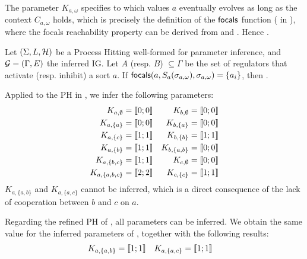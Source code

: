 The parameter $K_{a,\omega}$ specifies to which values $a$ eventually evolves as long as the context
$C_{a,\omega}$ holds, which is precisely the definition of the $\mathsf{focals}$ function
( in ),
where the focals reachability property can be derived from  and
.
Hence .

\begin{proposition}
\label{pps:param_K}
Let $(\Sigma, L, \mathcal{H})$ be a Process Hitting well-formed for parameter inference, and $\mathcal{G} = (\Gamma, E)$ the inferred IG.
Let $A$ (resp. $B$) $\subseteq \Gamma$ be the set of regulators that activate (resp. inhibit) a sort
$a$.
If $\mathsf{focals}(a,S_a(\sigma_{a,\omega}),\sigma_{a,\omega})= \{ a_i \}$, then .
\end{proposition}

\begin{example}
\label{ex:infer-param-runningPH-1}

Applied to the PH in , we infer the following parameters:
\begin{align*}
K_{a, \emptyset} &= \llbracket 0 ; 0 \rrbracket &
K_{b, \emptyset} &= \llbracket 0 ; 0 \rrbracket \\
K_{a, \{a\}} &= \llbracket 0 ; 0 \rrbracket &
K_{b, \{a\}} &= \llbracket 0 ; 0 \rrbracket \\
K_{a, \{c\}} &= \llbracket 1 ; 1 \rrbracket &
K_{b, \{b\}} &= \llbracket 1 ; 1 \rrbracket \\
K_{a, \{b\}} &= \llbracket 1 ; 1 \rrbracket &
K_{b, \{a,b\}} &= \llbracket 0 ; 0 \rrbracket \\
K_{a, \{b,c\}} &= \llbracket 1 ; 1 \rrbracket &
K_{c, \emptyset} &= \llbracket 0 ; 0 \rrbracket \\
K_{a, \{a,b,c\}} &= \llbracket 2 ; 2 \rrbracket &
K_{c, \{c\}} &= \llbracket 1 ; 1 \rrbracket
\end{align*}
$K_{a,\{a,b\}}$ and $K_{a,\{a,c\}}$ cannot be inferred,
which is a direct consequence of the lack of cooperation between $b$ and $c$ on $a$.
\end{example}

\begin{example}
Regarding the refined PH of , all parameters can be inferred.
We obtain the same value for the inferred parameters of ,
together with the following results:
\begin{align*}
  K_{a,\{a,b\}} &= \llbracket 1 ; 1 \rrbracket &
  K_{a,\{a,c\}} &= \llbracket 1 ; 1 \rrbracket
\end{align*}
\end{example}

